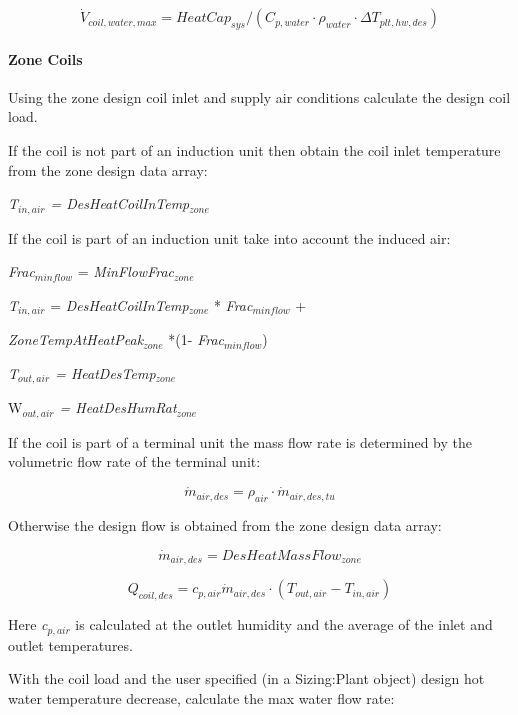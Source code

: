 \begin{equation}
\dot V_{coil,water,max} = HeatCap_{sys}/(C_{p,water} \cdot \rho_{water} \cdot \Delta T_{plt,hw,des})
\end{equation}

\paragraph{Zone Coils}\label{zone-coils}

Using the zone design coil inlet and supply air conditions calculate the design coil load.

If the coil is not part of an induction unit then obtain the coil inlet temperature from the zone design data array:

\emph{T\(_{in,air}\) = DesHeatCoilInTemp\(_{zone}\)}

If the coil is part of an induction unit take into account the induced air:

\emph{Frac\(_{minflow}\)} = \emph{MinFlowFrac\(_{zone}\)}

\emph{T\(_{in,air}\)} = \emph{DesHeatCoilInTemp\(_{zone}\)} * \emph{Frac\(_{minflow}\)} +

\emph{ZoneTempAtHeatPeak\(_{zone}\)} *(1- \emph{Frac\(_{minflow}\)})

\emph{T\(_{out,air}\) = HeatDesTemp\(_{zone}\)}

W\emph{\(_{out,air}\) = HeatDesHumRat\(_{zone}\)}

If the coil is part of a terminal unit the mass flow rate is determined by the volumetric flow rate of the terminal unit:

\begin{equation}
\dot m_{air,des} = \rho_{air} \cdot \dot m_{air,des,tu}
\end{equation}

Otherwise the design flow is obtained from the zone design data array:

\begin{equation}
\dot m_{air,des} = DesHeatMassFlow_{zone}
\end{equation}

\begin{equation}
Q_{coil,des} = c_{p,air} \dot m_{air,des} \cdot (T_{out,air} - T_{in,air})
\end{equation}

Here \emph{c\(_{p,air}\)} is calculated at the outlet humidity and the average of the inlet and outlet temperatures.

With the coil load and the user specified (in a Sizing:Plant object) design hot water temperature decrease, calculate the max water flow rate:

